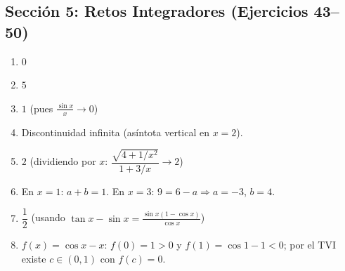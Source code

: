 \documentclass[12pt, letterpaper]{article}
\begin{document}
  \subsection*{Sección 5: Retos Integradores (Ejercicios 43--50)}
  \begin{enumerate}[resume=respuestas, leftmargin=*, label=\textbf{\arabic*.}]
    \item $0$
    \item $5$
    \item $1$ \quad (pues $\frac{\sin x}{x} \to 0$)
    \item Discontinuidad infinita (asíntota vertical en $x = 2$).
    \item $2$ \quad (dividiendo por $x$: $\dfrac{\sqrt{4 + 1/x^2}}{1 + 3/x} \to 2$)
    \item En $x = 1$: $a + b = 1$. \quad En $x = 3$: $9 = 6 - a \Rightarrow a = -3$, $b = 4$.
    \item $\dfrac{1}{2}$ \quad (usando $\tan x - \sin x = \frac{\sin x(1 - \cos x)}{\cos x}$)
    \item $f(x) = \cos x - x$: $f(0) = 1 > 0$ y $f(1) = \cos 1 - 1 < 0$; por el TVI existe $c \in (0, 1)$ con $f(c) = 0$.
  \end{enumerate}
\fi
\end{document}
